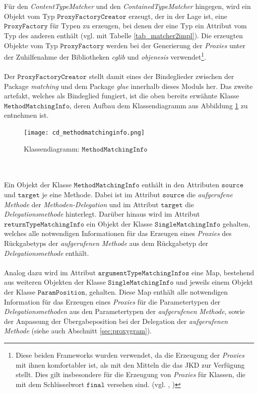 \\\\
Für den \emph{ContentTypeMatcher} und den \emph{ContainedTypeMatcher} hingegen, wird ein Objekt vom Typ $\texttt{ProxyFactoryCreator}$ erzeugt, der in der Lage ist, eine $\texttt{ProxyFactory}$ für Typen zu erzeugen, bei denen der eine Typ ein Attribut vom Typ des anderen enthält (vgl. mit Tabelle \ref{tab_matcher2impl}). Die erzeugten Objekte vom Typ $\texttt{ProxyFactory}$ werden bei der Generierung der \emph{Proxies} unter der Zuhilfenahme der Bibliotheken \emph{cglib} und \emph{objenesis} verwendet\footnote{Diese beiden Frameworks wurden verwendet, da die Erzeugung der \emph{Proxies} mit ihnen komfortabler ist, als mit den Mitteln die das JKD zur Verfügung stellt. Dies gilt insbesondere für die Erzeugung von \emph{Proxies} für Klassen, die mit dem Schlüsselwort $\texttt{final}$ versehen sind. (vgl. \cite{objenesis}, \cite{cglib})}.
\\\\
Der $\texttt{ProxyFactoryCreator}$ stellt damit eines der Bindeglieder zwischen der Package \emph{matching} und dem Package \emph{glue} innerhalb dieses \Gls{Modul}s her. Das zweite \Gls{artefakt}, welches als Bindeglied fungiert, ist die oben bereits erwähnte Klasse $\texttt{MethodMatchingInfo}$, deren Aufbau dem Klassendiagramm aus Abbildung \ref{cd_methodMatchingInfo} zu entnehmen ist.
\begin{figure}[h!]
\texttt{[image: cd\_methodmatchinginfo.png]}
\caption{Klassendiagramm: $\texttt{MethodMatchingInfo}$}
\label{cd_methodMatchingInfo}
\end{figure}
\noindent
\\\\
Ein Objekt der Klasse $\texttt{MethodMatchingInfo}$ enthält in den Attributen $\texttt{source}$ und $\texttt{target}$ je eine Methode. Dabei ist im Attribut $\texttt{source}$ die \emph{aufgerufene Methode} der \emph{Methoden-Delegation} und im Attribut $\texttt{target}$ die \emph{Delegationsmethode} hinterlegt. Darüber hinaus wird im Attribut $\texttt{returnTypeMatchingInfo}$ ein Objekt der Klasse $\texttt{SingleMatchingInfo}$ gehalten, welches alle notwendigen Informationen für das Erzeugen eines \emph{Proxies} des Rückgabetyps der \emph{aufgerufenen Methode} aus dem Rückgabetyp der \emph{Delegationsmethode} enthält.
\\\\
Analog dazu wird im Attribut $\texttt{argumentTypeMatchingInfos}$ eine Map, bestehend aus weiteren Objekten der Klasse $\texttt{SingleMatchingInfo}$ und jeweils einem Objekt der Klasse $\texttt{ParamPosition}$, gehalten. Diese Map enthält alle notwendigen Information für das Erzeugen eines \emph{Proxies} für die Parametertypen der \emph{Delegationsmethoden} aus den Parametertypen der \emph{aufgerufenen Methode}, sowie der Anpassung der Übergabeposition bei der Delegation der \emph{aufgerufenen Methode} (siehe auch Abschnitt \ref{sec:proxygram}).
